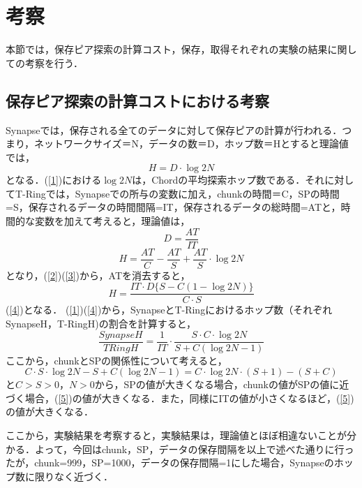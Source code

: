 \section{考察}
本節では，保存ピア探索の計算コスト，保存，取得それぞれの実験の結果に関しての考察を行う．
\subsection{保存ピア探索の計算コストにおける考察}
Synapseでは，保存される全てのデータに対して保存ピアの計算が行われる．つまり，ネットワークサイズ＝N，データの数＝D，ホップ数＝Hとすると理論値では，
\begin{equation}
H=D\cdot\log{2}N \label{1}
\end{equation}
となる．(\ref{1})における$\log{2}N$は，Chordの平均探索ホップ数である．それに対してT-Ringでは，Synapseでの所与の変数に加え，chunkの時間＝C，SPの時間=S，保存されるデータの時間間隔=IT，保存されるデータの総時間=ATと，時間的な変数を加えて考えると，理論値は，
\begin{equation}
D= \frac{AT}{IT} \label{2}
\end{equation}
\begin{equation}
H=\frac{AT}{C}- \frac{AT}{S} + \frac{AT}{S} \cdot\log{2}N \label{3}
\end{equation}
となり，(\ref{2})(\ref{3})から，ATを消去すると，
\begin{equation}
H=\frac{IT \cdot D\{S - C (1- \log{2}N ) \} }{C \cdot S} \label{4}
\end{equation}
(\ref{4})となる．
(\ref{1})(\ref{4})から，SynapseとT-Ringにおけるホップ数（それぞれSynapseH，T-RingH)の割合を計算すると，
\begin{equation}
\frac{SynapseH}{TRingH}=\frac{1}{IT} \cdot \frac{S \cdot C \cdot \log{2}N }{S + C(\log{2}N -1)}     \label{5}
\end{equation}
ここから，chunkとSPの関係性について考えると，
\begin{equation}
C \cdot S \cdot \log{2}N - S + C(\log{2}N - 1) = C \cdot \log{2} N \cdot (S+1) - ( S + C )
\end{equation}
と$C>S>0$，$N>0$から，SPの値が大きくなる場合，chunkの値がSPの値に近づく場合，(\ref{5})の値が大きくなる．また，同様にITの値が小さくなるほど，(\ref{5})の値が大きくなる．

ここから，実験結果を考察すると，実験結果は，理論値とほぼ相違ないことが分かる．よって，今回はchunk，SP，データの保存間隔を以上で述べた通りに行ったが，chunk=999，SP=1000，データの保存間隔=1にした場合，Synapseのホップ数に限りなく近づく．

